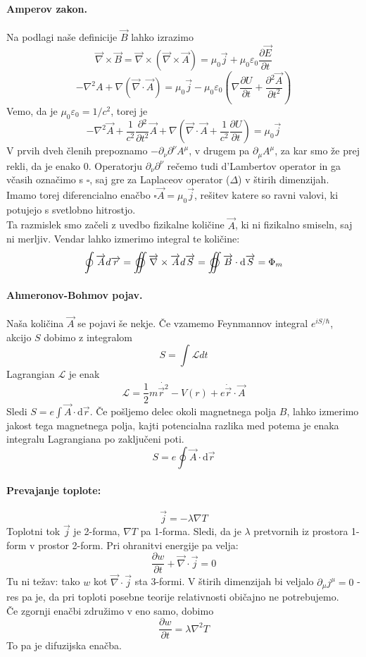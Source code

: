 \documentclass[a4paper]{article}
\newcommand{\vct}[1]{\overrightarrow{#1}}
\newcommand{\pd}[2]{\frac{\partial {#1}}{\partial {#2}}}
\begin{document}
\paragraph{Amperov zakon.} Na podlagi naše definicije $\vct{B}$ lahko izrazimo
$$\vct\nabla\times\vct{B} = \vct\nabla\times(\vct\nabla\times\vct{A}) = \mu_0\vct{j} + \mu_0\varepsilon_0\pd{\vct{E}}{t}$$
$$-\nabla^2A + \nabla(\vct\nabla\cdot\vct{A}) = \mu_0\vct{j}-\mu_0\varepsilon_0\left(\nabla\pd{U}{t} + \pd{^2\vct{A}}{t^2}\right)$$
Vemo, da je $\mu_0 \varepsilon_0 = 1/c^2$, torej je
$$-\nabla^2\vct{A} + \frac{1}{c^2}\pd{^2}{t^2}\vct{A} + \nabla\left(\vct\nabla\cdot\vct{A} + \frac{1}{c^2}\pd{U}{t}\right) = \mu_0\vct{j}$$
V prvih dveh členih prepoznamo $-\partial_\nu\partial^\nu A^\mu$, v drugem pa $\partial_\mu A^\mu$, za kar smo že prej rekli, da je enako 0.
Operatorju $\partial_\nu\partial^\nu$ rečemo tudi d'Lambertov operator in ga
včasih označimo s $\square$, saj gre za Laplaceov operator ($\Delta$) v štirih dimenzijah.
Imamo torej diferencialno enačbo $\displaystyle{\square\vct{A} = \mu_0\vct{j}}$, rešitev katere so ravni valovi, ki potujejo s svetlobno hitrostjo. \\[3mm]
Ta razmislek smo začeli z uvedbo fizikalne količine $\vct{A}$, ki ni fizikalno smiseln, saj ni merljiv. Vendar lahko izmerimo integral te količine:
$$\oint\vct{A}d\vct{r}=\varoiint\vct\nabla\times\vct{A}d\vct{S}=\varoiint\vct{B}\cdot\mathrm{d}\vct{S}=\Phi_m$$
\paragraph{Ahmeronov-Bohmov pojav.} Naša količina $\vct{A}$ se pojavi še nekje. Če vzamemo Feynmannov integral $\displaystyle{e^{iS/\hbar}}$, akcijo $S$ dobimo z integralom
$$S = \int\mathcal{L}dt$$
Lagrangian $\mathcal{L}$ je enak
$$\mathcal{L} = \frac{1}{2}m\dot{\vct{r}^2} - V(r) + e\dot{\vct{r}}\cdot\vct{A}$$
Sledi $\displaystyle{S=e\int\vct{A}\cdot\mathrm{d}\vct{r}}$. Če pošljemo delec okoli magnetnega polja $B$, 
lahko izmerimo jakost tega magnetnega polja, kajti potencialna razlika med potema je enaka integralu Lagrangiana po zaključeni poti.
$$S=e\oint\vct{A}\cdot\mathrm{d}\vct{r}$$
\paragraph{Prevajanje toplote:}
$$\vct{j} = -\lambda \nabla T$$
Toplotni tok $\vct{j}$ je 2-forma, $\nabla T$ pa 1-forma. Sledi, da je $\lambda$ pretvornih iz prostora 1-form v prostor 2-form. Pri ohranitvi energije pa velja:
$$\pd{w}{t} + \vct\nabla\cdot\vct{j} = 0$$
Tu ni težav: tako $w$ kot $\vct\nabla\cdot\vct{j}$ sta 3-formi. V štirih dimenzijah bi veljalo $\partial_\mu j^\mu = 0$ - res pa je, da pri toploti posebne teorije relativnosti običajno ne potrebujemo. \\
Če zgornji enačbi združimo v eno samo, dobimo
$$\pd{w}{t} = \lambda\nabla^2T$$
To pa je difuzijska enačba.
\end{document}
